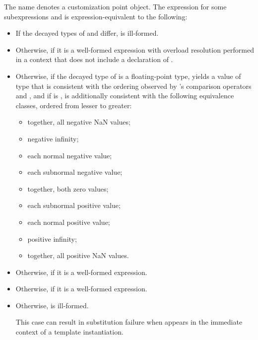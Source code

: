 %
\pnum
The name  denotes
a customization point object.
The expression 
for some subexpressions  and 
is expression-equivalent to the following:
\begin{itemize}
\item
  If the decayed types of  and  differ,
   is ill-formed.
\item
  Otherwise, 
  if it is a well-formed expression
  with overload resolution performed in a context
  that does not include a declaration of .
\item
  Otherwise, if the decayed type  of 
  is a floating-point type,
  yields a value of type 
  that is consistent with the ordering
  observed by ’s comparison operators and , and
  if  is ,
  is additionally consistent with the following equivalence classes,
  ordered from lesser to greater:
  \begin{itemize}
  \item together, all negative NaN values;
  \item negative infinity;
  \item each normal negative value;
  \item each subnormal negative value;
  \item together, both zero values;
  \item each subnormal positive value;
  \item each normal positive value;
  \item positive infinity;
  \item together, all positive NaN values.
  \end{itemize}
\item
  Otherwise,  if it is a well-formed expression.
\item
  Otherwise, 
  if it is a well-formed expression.
\item
  Otherwise,  is ill-formed.
  \begin{note}
  This case can result in substitution failure
  when  appears in the immediate context
  of a template instantiation.
  \end{note}
\end{itemize}


